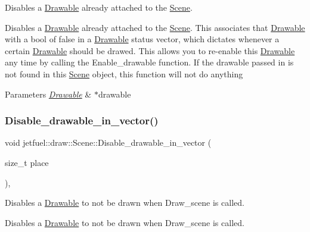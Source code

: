 Disables a \hyperlink{classjetfuel_1_1draw_1_1Drawable}{Drawable} already attached to the \hyperlink{classjetfuel_1_1draw_1_1Scene}{Scene}. 

Disables a \hyperlink{classjetfuel_1_1draw_1_1Drawable}{Drawable} already attached to the \hyperlink{classjetfuel_1_1draw_1_1Scene}{Scene}. This associates that \hyperlink{classjetfuel_1_1draw_1_1Drawable}{Drawable} with a bool of false in a \hyperlink{classjetfuel_1_1draw_1_1Drawable}{Drawable} status vector, which dictates whenever a certain \hyperlink{classjetfuel_1_1draw_1_1Drawable}{Drawable} should be drawed. This allows you to re-\/enable this \hyperlink{classjetfuel_1_1draw_1_1Drawable}{Drawable} any time by calling the Enable\+\_\+drawable function. If the drawable passed in is not found in this \hyperlink{classjetfuel_1_1draw_1_1Scene}{Scene} object, this function will not do anything


\begin{DoxyParams}{Parameters}
{\em \hyperlink{classjetfuel_1_1draw_1_1Drawable}{Drawable}} & $\ast$drawable \\
\hline
\end{DoxyParams}
\mbox{\label{classjetfuel_1_1draw_1_1Scene_a725618dfecbdb201fba44be02cc2bc13}} 
\subsubsection{\texorpdfstring{Disable\+\_\+drawable\+\_\+in\+\_\+vector()}{Disable\_drawable\_in\_vector()}}
{\footnotesize\ttfamily void jetfuel\+::draw\+::\+Scene\+::\+Disable\+\_\+drawable\+\_\+in\+\_\+vector (\begin{DoxyParamCaption}\item[{size\+\_\+t}]{place }\end{DoxyParamCaption})\hspace{0.3cm}{\ttfamily [inline]}, {\ttfamily [protected]}}



Disables a \hyperlink{classjetfuel_1_1draw_1_1Drawable}{Drawable} to not be drawn when Draw\+\_\+scene is called. 

Disables a \hyperlink{classjetfuel_1_1draw_1_1Drawable}{Drawable} to not be drawn when Draw\+\_\+scene is called.


